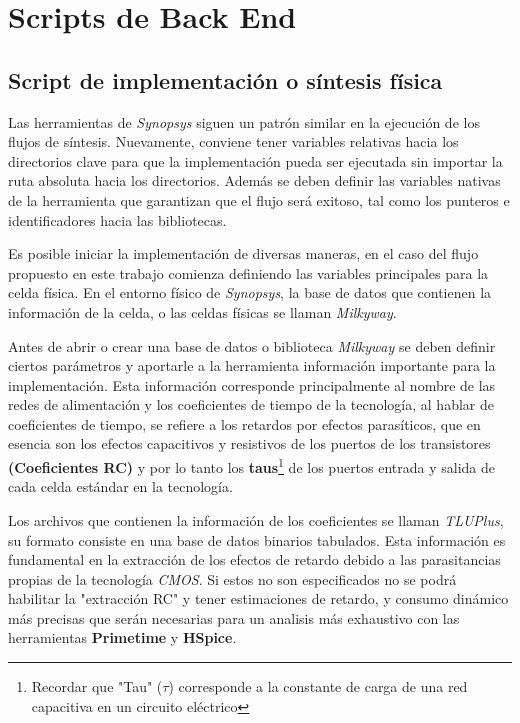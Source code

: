 \section{Scripts de Back End}
\label{sec:phy_s}
\subsection{Script de implementación o síntesis física}
Las herramientas de \textit{Synopsys} siguen un patrón similar en la ejecución de los flujos de síntesis. Nuevamente, conviene tener variables relativas hacia los directorios clave para que la implementación pueda ser ejecutada sin importar la ruta absoluta hacia los directorios. Además se deben definir las variables nativas de la herramienta que garantizan que el flujo será exitoso, tal como los punteros e identificadores hacia las bibliotecas.

Es posible iniciar la implementación de diversas maneras, en el caso del flujo propuesto en este trabajo comienza definiendo las variables principales para la celda física. En el entorno físico de \textit{Synopsys}, la base de datos que contienen la información de la celda, o las celdas físicas se llaman \textit{Milkyway}.

Antes de abrir o crear una base de datos o biblioteca \textit{Milkyway} se deben definir ciertos parámetros y aportarle a la herramienta información importante para la implementación. Esta información corresponde principalmente al nombre de las redes de alimentación y los coeficientes de tiempo de la tecnología, al hablar de coeficientes de tiempo, se refiere a los retardos por efectos parasíticos, que en esencia son los efectos capacitivos y resistivos de los puertos de los transistores \textbf{(Coeficientes RC)} y por lo tanto los \textbf{taus}\footnote{Recordar que "Tau" ($\tau$) corresponde a la constante de carga de una red capacitiva en un circuito eléctrico} de los puertos entrada y salida de cada celda estándar en la tecnología.

Los archivos que contienen la información de los coeficientes se llaman \textit{TLUPlus}, su formato consiste en una base de datos binarios tabulados. Esta información es fundamental en la extracción de los efectos de retardo debido a las parasitancias propias de la tecnología \textit{CMOS}. Si estos no son especificados no se podrá habilitar la "extracción RC" y tener estimaciones de retardo, y consumo dinámico más precisas que serán necesarias para un analisis más exhaustivo con las herramientas \textbf{Primetime} y \textbf{HSpice}.

